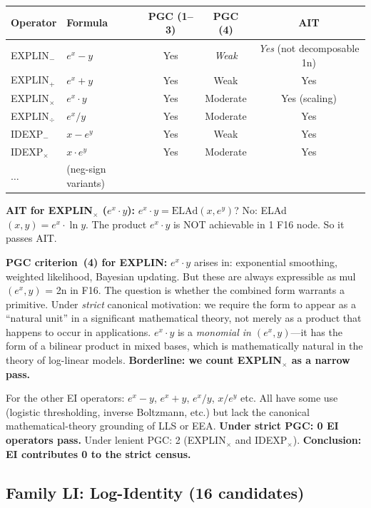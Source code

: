 \documentclass[11pt]{article}
\begin{document}
\begin{center}
\begin{tabular}{llccc}
\toprule
Operator & Formula & PGC (1--3) & PGC (4) & AIT \\
\midrule
EXPLIN$_-$ & $e^x - y$ & Yes & \emph{Weak} & \emph{Yes} (not decomposable 1n) \\
EXPLIN$_+$ & $e^x + y$ & Yes & Weak & Yes \\
EXPLIN$_\times$ & $e^x \cdot y$ & Yes & Moderate & Yes (scaling) \\
EXPLIN$_\div$ & $e^x / y$ & Yes & Moderate & Yes \\
IDEXP$_-$ & $x - e^y$ & Yes & Weak & Yes \\
IDEXP$_\times$ & $x \cdot e^y$ & Yes & Moderate & Yes \\
$\ldots$ & (neg-sign variants) & & & \\
\bottomrule
\end{tabular}
\end{center}

\noindent \textbf{AIT for EXPLIN$_\times$ ($e^x \cdot y$):}
$e^x \cdot y = \mathrm{ELAd}(x, e^y)$? No: ELAd$(x,y) = e^x \cdot \ln y$.
The product $e^x \cdot y$ is NOT achievable in 1 F16 node. So it passes AIT.

\noindent \textbf{PGC criterion~(4) for EXPLIN:}
$e^x \cdot y$ arises in: exponential smoothing, weighted likelihood, Bayesian updating.
But these are always expressible as mul$(e^x, y)$ = 2n in F16.
The question is whether the combined form warrants a primitive.
Under \emph{strict} canonical motivation: we require the form to appear as a
``natural unit'' in a significant mathematical theory, not merely as a product
that happens to occur in applications.
$e^x \cdot y$ is a \emph{monomial in $(e^x, y)$}---it has the form of a
bilinear product in mixed bases, which is mathematically natural in the theory
of log-linear models. \textbf{Borderline: we count EXPLIN$_\times$ as a narrow pass.}

For the other EI operators: $e^x - y$, $e^x + y$, $e^x / y$, $x/e^y$ etc.
All have some use (logistic thresholding, inverse Boltzmann, etc.) but lack the
canonical mathematical-theory grounding of LLS or EEA.
\textbf{Under strict PGC: 0 EI operators pass.}
Under lenient PGC: 2 (EXPLIN$_\times$ and IDEXP$_\times$).
\textbf{Conclusion: EI contributes 0 to the strict census.}

\subsection{Family LI: Log-Identity (16 candidates)}
\end{document}
